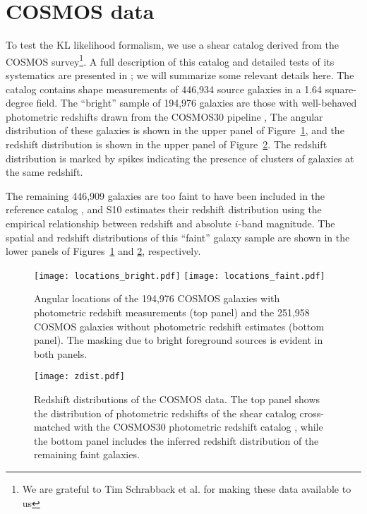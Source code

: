\section{COSMOS data}
\label{sec:data}
To test the KL likelihood formalism, we use a shear catalog derived from the
COSMOS survey\footnote{We are grateful to Tim Schrabback et al. for making 
these data available to us}.  A full description of this catalog and detailed 
tests of its systematics are presented in
\citet[][hereafter S10]{Schrabback10}; we will summarize some relevant
details here.
The catalog contains shape measurements of 446,934 source galaxies 
in a 1.64 square-degree field.
The ``bright'' sample of 194,976 galaxies are those with well-behaved
photometric redshifts drawn from the COSMOS30 pipeline
\citep[][S10]{Hildebrandt2009},  The angular distribution of these
galaxies is shown in the upper panel of Figure~\ref{fig:COSMOS_locations},
and the redshift distribution is shown in the upper panel of
Figure~\ref{fig:COSMOS_zdist}.  The redshift distribution is marked by
spikes indicating the presence of clusters of galaxies at the same redshift.

The remaining 446,909 galaxies are too faint to have been included
in the reference catalog \citep[the COSMOS30 redshifts are limited to
$i^+ < 25$; See][]{Ilbert09}, and S10 estimates their redshift distribution
using the empirical relationship between redshift and absolute $i$-band
magnitude.
The spatial and redshift distributions of this ``faint'' galaxy
sample are shown in the lower panels of Figures~\ref{fig:COSMOS_locations}
and \ref{fig:COSMOS_zdist}, respectively.

\begin{figure}
  \centering
  \texttt{[image: locations\_bright.pdf]}
  \texttt{[image: locations\_faint.pdf]}
  \caption{Angular locations of the 194,976 COSMOS galaxies with photometric
    redshift measurements (top panel)
    and the 251,958 COSMOS galaxies without photometric redshift estimates
    (bottom panel).  The masking due to bright foreground sources is evident
    in both panels.}
  \label{fig:COSMOS_locations}
\end{figure}

\begin{figure}
  \centering
  \texttt{[image: zdist.pdf]}
  \caption{Redshift distributions of the COSMOS data.  The top panel shows the
    distribution of photometric redshifts of the shear catalog cross-matched
    with the COSMOS30 photometric redshift catalog \citep{Ilbert09}, while
    the bottom panel includes the inferred redshift distribution of the
    remaining faint galaxies.}
  \label{fig:COSMOS_zdist}
\end{figure}

